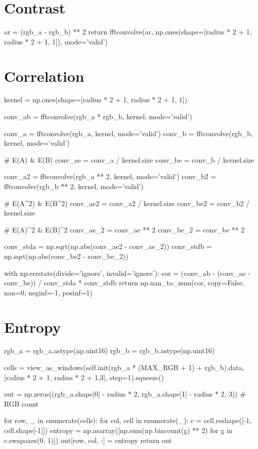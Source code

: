 \documentclass[article,oneside]{memoir}
\begin{document}
\section{Contrast}

\begin{python}
ar = (rgb_a - rgb_b) ** 2
     return fftconvolve(ar,
                        np.ones(shape=[radius * 2 + 1,
                                       radius * 2 + 1, 1]),
                        mode='valid')
\end{python}

\section{Correlation}

\begin{python}
kernel = np.ones(shape=[radius * 2 + 1, radius * 2 + 1, 1])

conv_ab = fftconvolve(rgb_a * rgb_b, kernel, mode='valid')

conv_a = fftconvolve(rgb_a, kernel, mode='valid')
conv_b = fftconvolve(rgb_b, kernel, mode='valid')

# E(A) & E(B)
conv_ae = conv_a / kernel.size
conv_be = conv_b / kernel.size

conv_a2 = fftconvolve(rgb_a ** 2, kernel, mode='valid')
conv_b2 = fftconvolve(rgb_b ** 2, kernel, mode='valid')

# E(A^2) & E(B^2)
conv_ae2 = conv_a2 / kernel.size
conv_be2 = conv_b2 / kernel.size

# E(A)^2 & E(B)^2
conv_ae_2 = conv_ae ** 2
conv_be_2 = conv_be ** 2

conv_stda = np.sqrt(np.abs(conv_ae2 - conv_ae_2))
conv_stdb = np.sqrt(np.abs(conv_be2 - conv_be_2))

with np.errstate(divide='ignore', invalid='ignore'):
    cor = (conv_ab - (conv_ae - conv_be)) / conv_stda * conv_stdb
    return np.nan_to_num(cor, copy=False, nan=0, neginf=-1, posinf=1)
\end{python}


\section{Entropy}

\begin{python}
rgb_a = rgb_a.astype(np.uint16)
rgb_b = rgb_b.astype(np.uint16)

cells = view_as_windows(self.init(rgb_a * (MAX_RGB + 1) + rgb_b).data,
                        [radius * 2 + 1, radius * 2 + 1,3],
                        step=1).squeeze()

out = np.zeros((rgb_a.shape[0] - radius * 2,
                rgb_a.shape[1] - radius * 2,
                3))  # RGB count

for row, _ in enumerate(cells):
    for col, cell in enumerate(_):
        c = cell.reshape([-1, cell.shape[-1]])
        entropy = np.asarray([np.sum(np.bincount(g) ** 2)
                              for g in c.swapaxes(0, 1)])
        out[row, col, :] = entropy
return out
\end{python}
\end{document}
